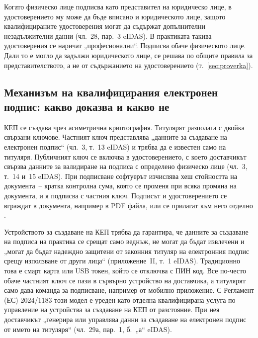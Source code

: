 Когато физическо лице подписва като представител на юридическо лице, в удостоверението му
може да бъде вписано и юридическото лице, защото квалифицираните удостоверения могат да
съдържат допълнителни незадължителни данни (чл.~28, пар.~3 eIDAS). В практиката такива
удостоверения се наричат „професионални“. Подписва обаче физическото лице. Дали то е
могло да задължи юридическото лице, се решава по общите правила за представителството, а
не от съдържанието на удостоверението (т.~\ref{sec:proverka}).

\subsection{Механизъм на квалифицирания електронен подпис: какво доказва и какво не}
\label{sec:mehanizam}

КЕП се създава чрез асиметрична криптография. Титулярят разполага с двойка свързани
ключове. Частният ключ представлява „данните за създаване на електронен подпис“ (чл.~3,
т.~13 eIDAS) и трябва да е известен само на титуляря. Публичният ключ се включва в
удостоверението, с което доставчикът свързва данните за валидиране на подписа с
определено физическо лице (чл.~3, т.~14 и~15 eIDAS). При подписване софтуерът изчислява
хеш стойността на документа~-- кратка контролна сума, която се променя при всяка промяна
на документа, и я подписва с частния ключ. Подписът и удостоверението се вграждат в
документа, например в PDF файла, или се прилагат към него отделно .

Устройството за създаване на КЕП трябва да гарантира, че данните за създаване на подписа
на практика се срещат само веднъж, не могат да бъдат извлечени и „могат да бъдат надеждно
защитени от законния титуляр на електронния подпис срещу използване от други лица“
(приложение~II, т.~1 eIDAS). Традиционно това е смарт карта или USB токен, който се
отключва с ПИН код. Все по-често обаче частният ключ се пази в сървърно устройство на
доставчика, а титулярят само дава команда за подписване, например от мобилно приложение.
С Регламент (ЕС) 2024/1183 този модел е уреден като отделна квалифицирана услуга по
управление на устройства за създаване на КЕП от разстояние. При нея доставчикът
„генерира или управлява данни за създаване на електронен подпис от името на титуляря“
(чл.~29а, пар.~1, б.~„а“ eIDAS).

